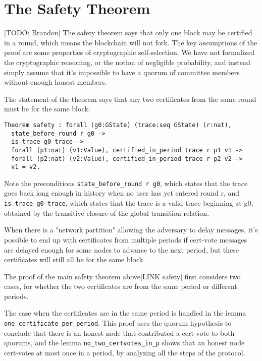 \section{The Safety Theorem}
\label{sec:safety}

[TODO: Brandon] 
The safety theorem says that only one block may be certified in a round, which means the blockchain will not fork. The key assumptions of the proof are some properties of cryptographic self-selection. We have not formalized the cryptographic reasoning, or the notion of negligible probability, and instead simply assume that it's impossible to have a quorum of committee members without enough honest members.

The statement of the theorem says that any two certificates from the same round must be for the same block:

\begin{lstlisting}[language=Coq]
Theorem safety : forall (g0:GState) (trace:seq GState) (r:nat),
  state_before_round r g0 ->
  is_trace g0 trace ->
  forall (p1:nat) (v1:Value), certified_in_period trace r p1 v1 ->
  forall (p2:nat) (v2:Value), certified_in_period trace r p2 v2 ->
  v1 = v2.
\end{lstlisting}


Note the preconditions \lstinline{state_before_round r g0}, which states that the trace goes back long enough in history when no user has yet entered round r, and \lstinline{is_trace g0 trace}, which states that the trace is a valid trace beginning at g0, obtained by the transitive closure of the global transition relation.

When there is a "network partition" allowing the adversary to delay messages, it's possible to end up with certificates from multiple periods if cert-vote messages are delayed enough for some nodes to advance to the next period, but these certificates will still all be for the same block.

The proof of the main safety theorem above[LINK safety] first considers two cases, for whether the two certificates are from the same period or different periods.

The case when the certificates are in the same period is handled in the lemma \lstinline{one_certificate_per_period}. This proof uses the quorum hypothesis to conclude that there is an honest node that contributed a cert-vote to both quorums, and the lemma \lstinline{no_two_certvotes_in_p} shows that an honest node cert-votes at most once in a period, by analyzing all the steps of the protocol.

